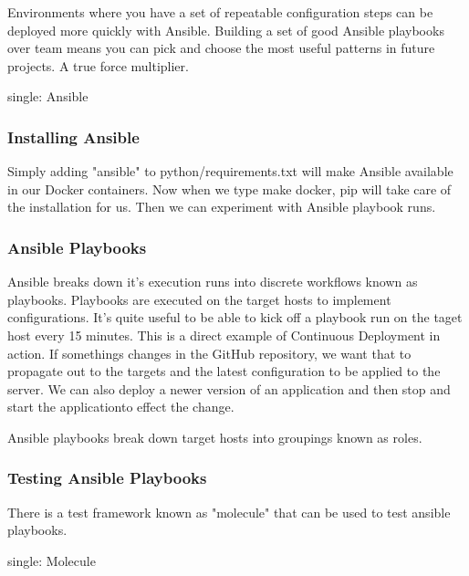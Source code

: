 Environments where you have a set of repeatable configuration steps can
be deployed more quickly with Ansible. Building a set of good Ansible
playbooks over team means you can pick and choose the most useful
patterns in future projects. A true force multiplier.

single: Ansible

\hypertarget{installing-ansible}{%
\subsubsection{Installing Ansible}\label{installing-ansible}}

Simply adding "ansible" to python/requirements.txt will make Ansible
available in our Docker containers. Now when we type make docker, pip
will take care of the installation for us. Then we can experiment with
Ansible playbook runs.

\hypertarget{ansible-playbooks}{%
\subsubsection{Ansible Playbooks}\label{ansible-playbooks}}

Ansible breaks down it's execution runs into discrete workflows known as
playbooks. Playbooks are executed on the target hosts to implement
configurations. It's quite useful to be able to kick off a playbook run
on the taget host every 15 minutes. This is a direct example of
Continuous Deployment in action. If somethings changes in the GitHub
repository, we want that to propagate out to the targets and the latest
configuration to be applied to the server. We can also deploy a newer
version of an application and then stop and start the applicationto
effect the change.

Ansible playbooks break down target hosts into groupings known as roles.

\hypertarget{testing-ansible-playbooks}{%
\subsubsection{Testing Ansible
Playbooks}\label{testing-ansible-playbooks}}

There is a test framework known as "molecule" that can be used to test
ansible playbooks.

single: Molecule

\begin{Shaded}
\begin{Highlighting}[]
\NormalTok{$ }
\ExtensionTok{--}\OperatorTok{>}
\end{Highlighting}
\end{Shaded}

